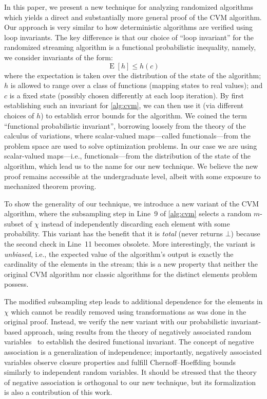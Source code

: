 \documentclass[a4paper,UKenglish,cleveref, autoref, thm-restate]{lipics-v2021}
\DeclareMathOperator{\expect}{\mathrm{E}}
\begin{document}
In this paper, we present a new technique for analyzing randomized algorithms which yields a direct and substantially more general proof of the CVM algorithm.
Our approach is very similar to how deterministic algorithms are verified using loop invariants.
The key difference is that our choice of ``loop invariant'' for the randomized streaming algorithm is a functional probabilistic inequality, namely, we consider invariants of the form:
\[
  \expect [ h ] \leq h(c)
\]
where the expectation is taken over the distribution of the state of the algorithm; $h$ is allowed to range over a class of functions (mapping states to real values); and $c$ is a fixed state (possibly chosen differently at each loop iteration).
By first establishing such an invariant for \cref{alg:cvm}, we can then use it (via different choices of $h$) to establish error bounds for the algorithm.
We coined the term ``functional probabilistic invariant'', borrowing loosely from the theory of the calculus of variations, where scalar-valued maps---called functionals---from the problem space are used to solve optimization problems.
In our case we are using scalar-valued maps---i.e., functionals---from the distribution of the state of the algorithm, which lead us to the name for our new technique.
We believe the new proof remains accessible at the undergraduate level, albeit with some exposure to mechanized theorem proving.

To show the generality of our technique, we introduce a new variant of the CVM algorithm, where the subsampling step in Line~9 of \cref{alg:cvm} selects a random $m$-subset of $\chi$ instead of independently discarding each element with some probability.
This variant has the benefit that it is \emph{total} (never returns $\bot$) because the second check in Line~11 becomes obsolete.
More interestingly, the variant is \emph{unbiased}, i.e., the expected value of the algorithm's output is exactly the cardinality of the elements in the stream; this is a new property that neither the original CVM algorithm nor classic algorithms for the distinct elements problem possess.

The modified subsampling step leads to additional dependence for the elements in $\chi$ which cannot be readily removed using transformations as was done in the original proof.
Instead, we verify the new variant with our probabilistic invariant-based approach, using results from the theory of negatively associated random variables~\cite{joagdev1983} to establish the desired functional invariant.
The concept of negative association is a generalization of independence; importantly, negatively associated variables observe closure properties and fulfill Chernoff--Hoeffding bounds similarly to independent random variables.
It should be stressed that the theory of negative association is orthogonal to our new technique, but its formalization is also a contribution of this work.
\end{document}
